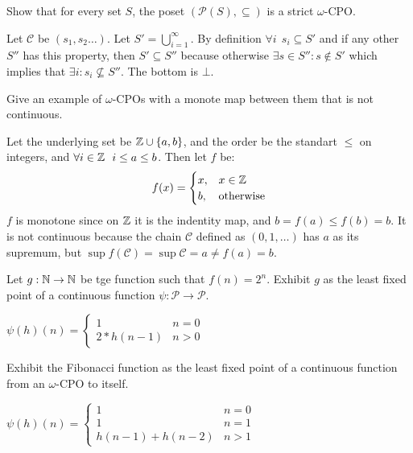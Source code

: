 \begin{exercise}
    Show that for every set \(S\), the poset \((\mathcal{P}(S), \subseteq)\) is a strict \(\omega\)-CPO.
\end{exercise}
\begin{solution}
    Let \(\mathcal{C}\) be \((s_1, s_2 \dots )\). Let \(S' = \bigcup_{i = 1}^{\infty} \). By definition \(\forall i \ \ s_i \subseteq S'\) and if any other \(S''\) has this property, then \(S' \subseteq S''\) because otherwise \(\exists s \in S'' : s \notin S'\) which implies that \(\exists i : s_i \not\subseteq S''\). The bottom is \(\bot\).
\end{solution}

\begin{exercise}
    Give an example of \(\omega\)-CPOs with a monote map between them that is not continuous.
\end{exercise}
\begin{solution}
    Let the underlying set be \(\mathbb{Z} \cup \{a, b\}\), and the order be the standart \(\leq\) on integers, and \(\forall i \in \mathbb{Z} \ \ i \leq a \leq b\). Then let \(f\) be:
    \[f(x) = \begin{cases}
            x, & x \in \mathbb{Z}           \\
            b, & \mathrm{otherwise}
        \end{cases}\]
    \(f\) is monotone since on \(\mathbb{Z}\) it is the indentity map, and \(b = f(a) \leq f(b) = b\). It is not continuous because the chain \(\mathcal{C}\) defined as \((0, 1, \dots)\) has \(a\) as its supremum, but \(\sup f(\mathcal{C}) = \sup \mathcal{C} = a \neq f(a) = b\).
\end{solution}

\begin{exercise}
    Let \(g : \mathbb{N} \to \mathbb{N}\) be tge function such that \(f(n) = 2^n\). Exhibit \(g\) as the least fixed point of a continuous function \(\psi : \mathscr{P} \to \mathscr{P}\).
\end{exercise}
\begin{solution}
    \(\psi(h)(n) = \begin{cases}
        1            & n = 0 \\
        2 * h(n - 1) & n > 0
    \end{cases}\)
\end{solution}

\begin{exercise}
    Exhibit the Fibonacci function as the least fixed point of a continuous function from an \(\omega\)-CPO to itself.
\end{exercise}
\begin{solution}
    \(\psi(h)(n) = \begin{cases}
        1                   & n = 0 \\
        1                   & n = 1 \\
        h(n - 1) + h(n - 2) & n > 1
    \end{cases}\)
\end{solution}


